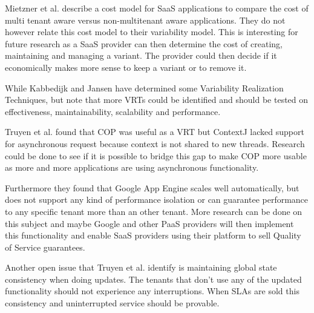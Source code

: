 Mietzner et al. \cite{mietzner2009variability} describe a cost model for SaaS applications to compare the cost of multi tenant aware versus non-multitenant aware applications. They do not however relate this cost model to their variability model. This is interesting for future research as a SaaS provider can then determine the cost of creating, maintaining and managing a variant. The provider could then decide if it economically makes more sense to keep a variant or to remove it.


While Kabbedijk and Jansen \cite{kabbedijk2011variability} have determined some Variability Realization Techniques, but note that more VRTs could be identified and should be tested on effectiveness, maintainability, scalability and performance.

Truyen et al. \cite{truyen2012context} found that COP was useful as a VRT but ContextJ lacked support for asynchronous request because context is not shared to new threads. Research could be done to see if it is possible to bridge this gap to make COP more usable as more and more applications are using asynchronous functionality.

Furthermore they found that Google App Engine scales well automatically, but does not support any kind of performance isolation or can guarantee performance to any specific tenant more than an other tenant. More research can be done on this subject and maybe Google and other PaaS providers will then implement this functionality and enable SaaS providers using their platform to sell Quality of Service guarantees.

Another open issue that Truyen et al. identify is maintaining global state consistency when doing updates. The tenants that don't use any of the updated functionality should not experience any interruptions. When SLAs are sold this consistency and uninterrupted service should be provable.

